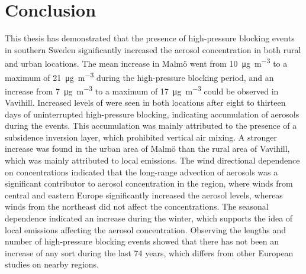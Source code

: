 \section{Conclusion}
This thesis has demonstrated that the presence of high-pressure blocking events in southern Sweden significantly increased the aerosol concentration in both rural and urban locations. The \PM mean increase in Malmö went from \SI{10}{\micro\gram\per\meter\cubed} to a maximum of \SI{21}{\micro\gram\per\meter\cubed} during the high-pressure blocking period, and an increase from \SI{7}{\micro\gram\per\meter\cubed} to a maximum of \SI{17}{\micro\gram\per\meter\cubed} could be observed in Vavihill. Increased levels of \PM were seen in both locations after eight to thirteen days of uninterrupted high-pressure blocking, indicating accumulation of aerosols during the events. This accumulation was mainly attributed to the presence of a subsidence inversion layer, which prohibited vertical air mixing. A stronger increase was found in the urban area of Malmö than the rural area of Vavihill, which was mainly attributed to local emissions. The wind directional dependence on \PM concentrations indicated that the long-range advection of aerosols was a significant contributor to aerosol concentration in the region, where winds from central and eastern Europe significantly increased the aerosol levels, whereas winds from the northeast did not affect the concentrations. The seasonal dependence indicated an increase during the winter, which supports the idea of local emissions affecting the aerosol concentration. Observing the lengths and number of high-pressure blocking events showed that there has not been an increase of any sort during the last 74 years, which differs from other European studies on nearby regions.

